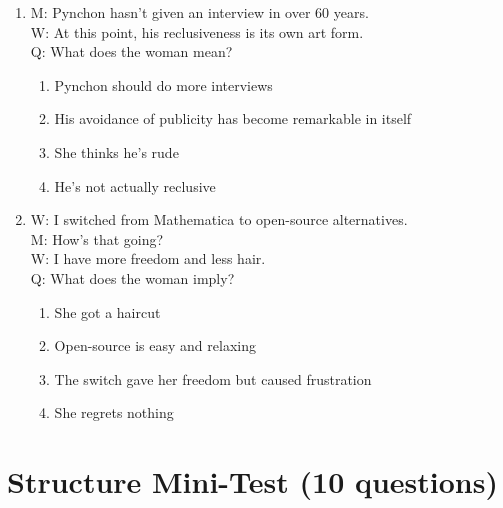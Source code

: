\documentclass[10pt,a4paper]{article}
\begin{document}
\begin{enumerate}[label=\textbf{\arabic*.}, leftmargin=*]
\item M: Pynchon hasn't given an interview in over 60 years.\\
W: At this point, his reclusiveness is its own art form.\\
Q: What does the woman mean?
\begin{enumerate}[label=(\Alph*)]
\item Pynchon should do more interviews
\item His avoidance of publicity has become remarkable in itself
\item She thinks he's rude
\item He's not actually reclusive
\end{enumerate}

\item W: I switched from Mathematica to open-source alternatives.\\
M: How's that going?\\
W: I have more freedom and less hair.\\
Q: What does the woman imply?
\begin{enumerate}[label=(\Alph*)]
\item She got a haircut
\item Open-source is easy and relaxing
\item The switch gave her freedom but caused frustration
\item She regrets nothing
\end{enumerate}

\end{enumerate}

\section*{Structure Mini-Test (10 questions)}
\end{document}

